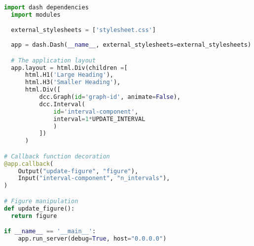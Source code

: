 \begin{lstlisting}[language=python, caption={Pseudocode showing the structure of a Plotly Dash app}, label={lst:dash}]
  import dash dependencies
  import modules

  external_stylesheets = ['stylesheet.css']
  
  app = dash.Dash(__name__, external_stylesheets=external_stylesheets)

  # The application layout
  app.layout = html.Div(children =[
      html.H1('Large Heading'),
      html.H3('Smaller Heading'),
      html.Div([
          dcc.Graph(id='graph-id', animate=False),
          dcc.Interval(
              id='interval-component',
              interval=1*UPDATE_INTERVAL
              )
          ])
      )

# Callback function decoration
@app.callback(
    Output("update-figure", "figure"),
    Input("interval-component", "n_intervals"),
)

# Figure manipulation
def update_figure():
  return figure

if __name__ == '__main__':
    app.run_server(debug=True, host="0.0.0.0")
\end{lstlisting}
